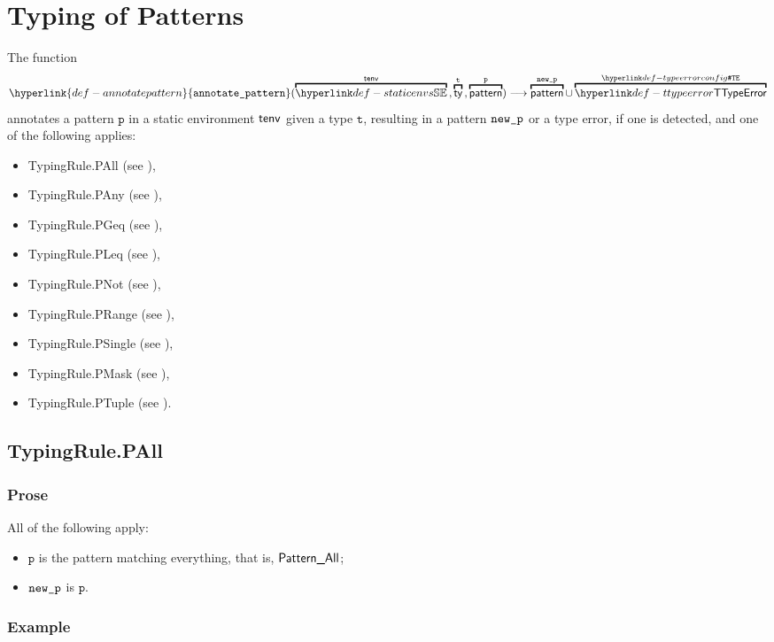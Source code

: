 \documentclass{book}
\newcommand\annotatepattern[0]{\hyperlink{def-annotatepattern}{\texttt{annotate\_pattern}}}
\newcommand\vp[0]{\texttt{p}}
\newcommand\vt[0]{\texttt{t}}
\begin{document}
\chapter{Typing of Patterns}
\hypertarget{def-annotatepattern}{}
The function
\[
  \annotatepattern(
    \overname{\staticenvs}{\tenv} \aslsep
    \overname{\ty}{\vt} \aslsep
    \overname{\pattern}{\vp}) \aslto \overname{\pattern}{\newp} \cup \overname{\TTypeError}{\TypeErrorConfig}
\]
annotates a pattern $\vp$ in a static environment $\textsf{tenv}$ given a type $\vt$,
resulting in a pattern $\texttt{new\_p}$ or a type error, if one is detected, and one of the following applies:
\begin{itemize}
\item TypingRule.PAll (see ),
\item TypingRule.PAny (see ),
\item TypingRule.PGeq (see ),
\item TypingRule.PLeq (see ),
\item TypingRule.PNot (see ),
\item TypingRule.PRange (see ),
\item TypingRule.PSingle (see ),
\item TypingRule.PMask (see ),
\item TypingRule.PTuple (see ).
\end{itemize}

\section{TypingRule.PAll \label{sec:TypingRule.PAll}}

\subsection{Prose}
All of the following apply:
\begin{itemize}
  \item $\vp$ is the pattern matching everything, that is, $\textsf{Pattern\_All}$;
  \item $\texttt{new\_p}$ is $\vp$.
\end{itemize}

\subsection{Example}
\end{document}
